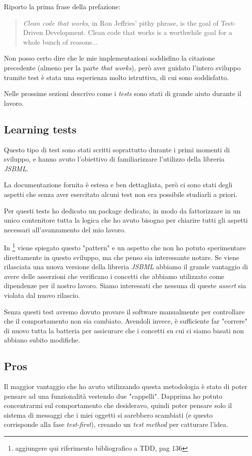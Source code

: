 Riporto la prima frase della prefazione:
\begin{quotation}
  \emph{Clean code that works}, in Ron Jeffries' pithy phrase, is the
  goal of Test-Driven Development. Clean code that works is a
  worthwhile goal for a whole bunch of reasons...
\end{quotation}
Non posso certo dire che le mie implementazioni soddisfino la
citazione precedente (almeno per la parte \emph{that works}), per\`o
aver guidato l'intero sviluppo tramite test \`e stata una esperienza
molto istruttiva, di cui sono soddisfatto.

Nelle prossime sezioni descrivo come i \emph{tests} sono stati di
grande aiuto durante il lavoro.

\subsection{Learning tests}
Questo tipo di test sono stati scritti soprattutto durante i primi
momenti di sviluppo, e hanno avuto l'obiettivo di
familiarizzare l'utilizzo della libreria \emph{JSBML}. 

La documentazione fornita \`e estesa e ben dettagliata, per\`o ci
sono stati degli aspetti che senza aver esercitato alcuni test non era
possibile studiarli a priori.

Per questi tests ho dedicato un package dedicato, in modo da
fattorizzare in un unico contenitore tutta la logica che ho avuto
bisogno per chiarire tutti gli aspetti necessari all'avanzamento del
mio lavoro.

In \footnote{aggiungere qui riferimento bibliografico a TDD, pag 136}
viene spiegato questo "pattern" e un aspetto che non ho potuto
sperimentare direttamente in questo sviluppo, ma che penso sia
interessante notare. Se viene rilasciata una nuova versione della
libreria \emph{JSBML} abbiamo il grande vantaggio di avere delle
asserzioni che verificano i concetti che abbiamo utilizzato come
dipendenze per il nostro lavoro. Siamo interessati che nessuna di
queste \emph{assert} sia violata dal nuovo rilascio. 

Senza questi test avremo dovuto provare il software manualmente per
controllare che il comportamento non sia cambiato. Avendoli invece,
\`e sufficiente far "correre" di nuovo tutta la batteria per
assicurare che i concetti su cui ci siamo basati non abbiano subito
modifiche.

\subsection{Pros}
Il maggior vantaggio che ho avuto utilizzando questa metodologia \`e
stato di poter pensare ad una funzionalit\`a vestendo due
"cappelli". Dapprima ho potuto concentrarmi sul comportamento che
desideravo, quindi poter pensare solo il sistema di messaggi che i
miei oggetti si sarebbero scambiati (e questo corrisponde alla fase
\emph{test-first}), creando un \emph{test method} per catturare
l'idea.

